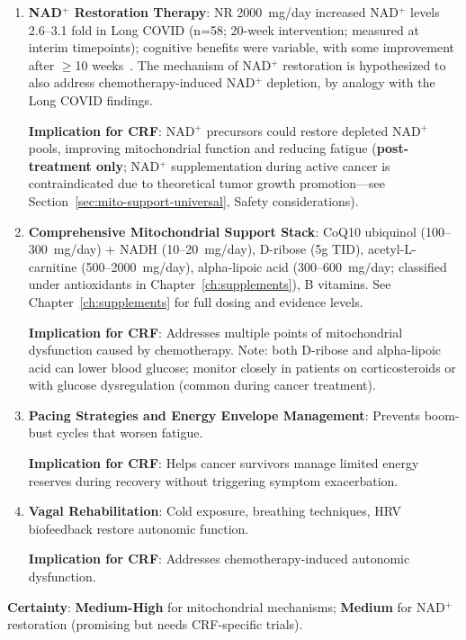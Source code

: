 \begin{enumerate}
    \item \textbf{NAD$^+$ Restoration Therapy}: NR 2000~mg/day increased NAD$^+$ levels 2.6--3.1 fold in Long COVID (n=58; 20-week intervention; measured at interim timepoints); cognitive benefits were variable, with some improvement after $\geq$10 weeks~\cite{Wu2025NRLongCOVID}. The mechanism of NAD$^+$ restoration is hypothesized to also address chemotherapy-induced NAD$^+$ depletion, by analogy with the Long COVID findings.

    \textbf{Implication for CRF}: NAD$^+$ precursors could restore depleted NAD$^+$ pools, improving mitochondrial function and reducing fatigue (\textbf{post-treatment only}; NAD$^+$ supplementation during active cancer is contraindicated due to theoretical tumor growth promotion---see Section~\ref{sec:mito-support-universal}, Safety considerations).

    \item \textbf{Comprehensive Mitochondrial Support Stack}: CoQ10 ubiquinol (100--300~mg/day) + NADH (10--20~mg/day), D-ribose (5g TID), acetyl-L-carnitine (500--2000~mg/day), alpha-lipoic acid (300--600~mg/day; classified under antioxidants in Chapter~\ref{ch:supplements}), B vitamins. See Chapter~\ref{ch:supplements} for full dosing and evidence levels.

    \textbf{Implication for CRF}: Addresses multiple points of mitochondrial dysfunction caused by chemotherapy. Note: both D-ribose and alpha-lipoic acid can lower blood glucose; monitor closely in patients on corticosteroids or with glucose dysregulation (common during cancer treatment).

    \item \textbf{Pacing Strategies and Energy Envelope Management}: Prevents boom-bust cycles that worsen fatigue.

    \textbf{Implication for CRF}: Helps cancer survivors manage limited energy reserves during recovery without triggering symptom exacerbation.

    \item \textbf{Vagal Rehabilitation}: Cold exposure, breathing techniques, HRV biofeedback restore autonomic function.

    \textbf{Implication for CRF}: Addresses chemotherapy-induced autonomic dysfunction.
\end{enumerate}

\textbf{Certainty}: \textbf{Medium-High} for mitochondrial mechanisms; \textbf{Medium} for NAD$^+$ restoration (promising but needs CRF-specific trials).

